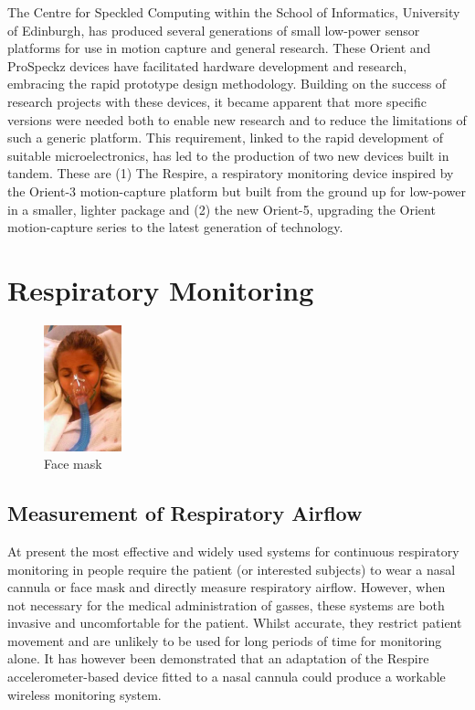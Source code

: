 The Centre for Speckled Computing within the School of Informatics, University of
Edinburgh, has produced several generations of small low-power sensor platforms for use
in motion capture and general research. These Orient\cite{Orient2012} and ProSpeckz\cite{ProSpeckz2012} devices
have facilitated hardware development and research, embracing the rapid prototype
design methodology. Building on the success of research projects with these devices, it
became apparent that more specific versions were needed both to enable new research and to
reduce the limitations of such a generic platform. This requirement, linked to the rapid development
of suitable microelectronics, has led to the production of two new devices built in tandem. These are
(1) The Respire, a respiratory monitoring device inspired by the Orient-3 motion-capture platform
but built from the ground up for low-power in a smaller, lighter package and (2) the new Orient-5,
upgrading the Orient motion-capture series to the latest generation of technology.

\section{Respiratory Monitoring}

\begin{figure}
  \vspace{-10pt}
  \begin{center}
    \includegraphics[width=0.2\textwidth, keepaspectratio=true]{images/Plastic_oxygen_mask_on_an_ER_patient.jpg}
  \end{center}
  \caption[Face Mask]{Face mask \cite{FaceMaskImg}}
  \vspace{-10pt}
\end{figure}

\subsection{Measurement of Respiratory Airflow}
At present the most effective and widely used systems for continuous respiratory monitoring in
people require the patient (or interested subjects) to wear a nasal cannula or face mask and directly
measure respiratory airflow. However, when not necessary for the medical administration of gasses,
these systems are both invasive and uncomfortable for the patient\cite{NasalCannula2011}. Whilst accurate, they
restrict patient movement and are unlikely to be used for long periods of time for monitoring alone.
It has however been demonstrated that an adaptation of the Respire accelerometer-based device
fitted to a nasal cannula could produce a workable wireless monitoring system.

